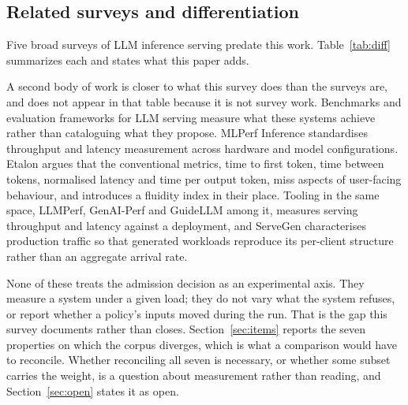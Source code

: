 \subsection{Related surveys and differentiation}

Five broad surveys of LLM inference serving predate this work.
Table~\ref{tab:diff} summarizes each and states what this paper adds.

A second body of work is closer to what this survey does than the
surveys are, and does not appear in that table because it is not
survey work. Benchmarks and evaluation frameworks for LLM serving
measure what these systems achieve rather than cataloguing what they
propose. MLPerf Inference \citep{reddi2020mlperf} standardises
throughput and latency measurement across hardware and model
configurations. Etalon \citep{agrawal2024etalon} argues that the
conventional metrics, time to first token, time between tokens,
normalised latency and time per output token, miss aspects of
user-facing behaviour, and introduces a fluidity index in their place.
Tooling in the same space, LLMPerf, GenAI-Perf and GuideLLM among it,
measures serving throughput and latency against a deployment, and
ServeGen \citep{xiang2025servegen} characterises production traffic so
that generated workloads reproduce its per-client structure rather than
an aggregate arrival rate.

None of these treats the admission decision as an experimental axis.
They measure a system under a given load; they do not vary what the
system refuses, or report whether a policy's inputs moved during the
run. That is the gap this survey documents rather than closes.
Section~\ref{sec:items} reports the seven properties on which the
corpus diverges, which is what a comparison would have to reconcile.
Whether reconciling all seven is necessary, or whether some subset
carries the weight, is a question about measurement rather than
reading, and Section~\ref{sec:open} states it as open.

